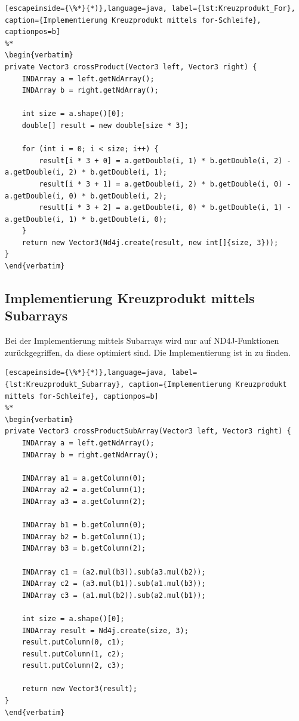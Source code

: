 \begin{lstlisting}[escapeinside={\%*}{*)},language=java, label={lst:Kreuzprodukt_For}, caption={Implementierung Kreuzprodukt mittels for-Schleife}, captionpos=b]
%*
\begin{verbatim}
private Vector3 crossProduct(Vector3 left, Vector3 right) {
    INDArray a = left.getNdArray();
    INDArray b = right.getNdArray();

    int size = a.shape()[0];
    double[] result = new double[size * 3];

    for (int i = 0; i < size; i++) {
        result[i * 3 + 0] = a.getDouble(i, 1) * b.getDouble(i, 2) - a.getDouble(i, 2) * b.getDouble(i, 1);
        result[i * 3 + 1] = a.getDouble(i, 2) * b.getDouble(i, 0) - a.getDouble(i, 0) * b.getDouble(i, 2);
        result[i * 3 + 2] = a.getDouble(i, 0) * b.getDouble(i, 1) - a.getDouble(i, 1) * b.getDouble(i, 0);
    }
    return new Vector3(Nd4j.create(result, new int[]{size, 3}));
}
\end{verbatim}
\end{lstlisting}

\subsection{Implementierung Kreuzprodukt mittels Subarrays}
Bei der Implementierung mittels Subarrays wird nur auf ND4J-Funktionen zurückgegriffen, da diese optimiert sind.
Die Implementierung ist in  zu finden.
\begin{lstlisting}[escapeinside={\%*}{*)},language=java, label={lst:Kreuzprodukt_Subarray}, caption={Implementierung Kreuzprodukt mittels for-Schleife}, captionpos=b]
%*
\begin{verbatim}
private Vector3 crossProductSubArray(Vector3 left, Vector3 right) {
    INDArray a = left.getNdArray();
    INDArray b = right.getNdArray();

    INDArray a1 = a.getColumn(0);
    INDArray a2 = a.getColumn(1);
    INDArray a3 = a.getColumn(2);

    INDArray b1 = b.getColumn(0);
    INDArray b2 = b.getColumn(1);
    INDArray b3 = b.getColumn(2);

    INDArray c1 = (a2.mul(b3)).sub(a3.mul(b2));
    INDArray c2 = (a3.mul(b1)).sub(a1.mul(b3));
    INDArray c3 = (a1.mul(b2)).sub(a2.mul(b1));

    int size = a.shape()[0];
    INDArray result = Nd4j.create(size, 3);
    result.putColumn(0, c1);
    result.putColumn(1, c2);
    result.putColumn(2, c3);

    return new Vector3(result);
}
\end{verbatim}
\end{lstlisting}

